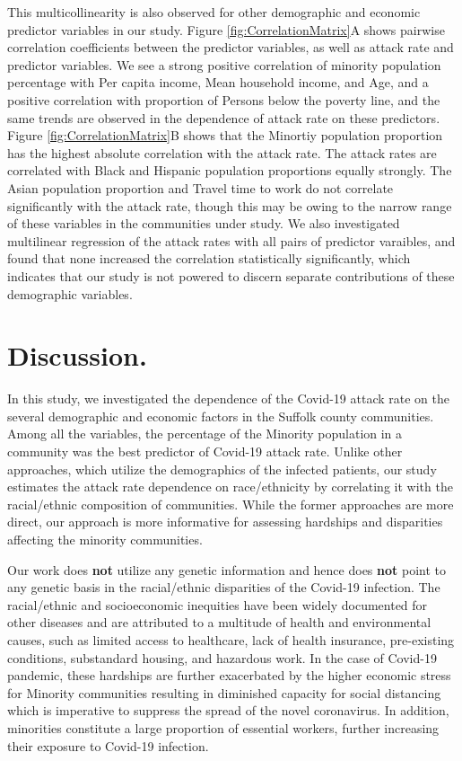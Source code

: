 \documentclass[twoside,12pt,onecolumn]{article}
\begin{document}
This multicollinearity is also observed for other demographic and economic predictor variables in our study.
Figure \ref{fig:CorrelationMatrix}A shows pairwise correlation coefficients between the predictor variables, as well as attack rate and predictor variables.
We see a strong positive correlation of minority population percentage with Per capita income, Mean household income, and Age, and a positive correlation with proportion of Persons below the poverty line, and the same trends are observed in the dependence of attack rate on these predictors.
Figure \ref{fig:CorrelationMatrix}B shows that the Minortiy population proportion has the highest absolute correlation with the attack rate. The attack rates are correlated with Black and Hispanic population proportions equally strongly. The Asian population proportion and Travel time to work do not correlate significantly with the attack rate, though this may be owing to the narrow range of these variables in the communities under study.
We also investigated multilinear regression of the attack rates with all pairs of predictor varaibles, and found that none increased the correlation statistically significantly, which indicates that our study is not powered to discern separate contributions of these demographic variables.

\section{Discussion.}
In this study, we investigated the dependence of the Covid-19 attack rate on the several demographic and economic factors in the Suffolk county communities. Among all the variables, the percentage of the Minority population in a community was the best predictor of Covid-19 attack rate. Unlike other approaches, which utilize the demographics of the infected patients, our study estimates the attack rate dependence on race/ethnicity by correlating it with the racial/ethnic composition of communities. While the former approaches are more direct, our approach is more informative for assessing hardships and disparities affecting the minority communities.

Our work does \textbf{not} utilize any genetic information and hence does \textbf{not} point to any genetic basis in the racial/ethnic disparities of the Covid-19 infection. The racial/ethnic and socioeconomic inequities have been widely documented for other diseases and are attributed to a multitude of health and environmental causes, such as limited access to healthcare, lack of health insurance, pre-existing conditions, substandard housing, and hazardous work. In the case of Covid-19 pandemic, these hardships are further exacerbated by the higher economic stress for Minority communities resulting in diminished capacity for social distancing which is imperative to suppress the spread of the novel coronavirus. In addition, minorities constitute a large proportion of essential workers, further increasing their exposure to Covid-19 infection.
\end{document}
